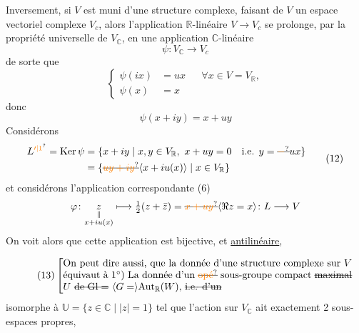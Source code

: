 Inversement, si $V$ est muni d'une structure complexe,  faisant de $V$ un espace vectoriel complexe $V_c$, alors l'application  $\mathbb R$-linéaire $V\longrightarrow V_c$ se prolonge, par la propriété universelle de $V_{\mathbb C}$, en une application $\mathbb C$-linéaire
\[
 \psi\colon V_{\mathbb C}\longrightarrow V_c \tag*{(9)}
\]
de sorte que
\[
 \left\{\begin{aligned}\psi(ix)&=ux&&\forall x\in V=V_{\mathbb R},\\ \psi(x)&=x\end{aligned}\right. \tag*{(10)}
\]
donc
\[
 \psi(x+iy)=x+uy \tag*{(11)}
\]
  Considérons
\[
 \begin{aligned}
 L^{\unsure{\prime|1}}=\mathrm{Ker}\,\psi
 &=\{x+iy\mid x,y\in V_{\mathbb R},\ x+uy=0\quad\text{i.e. }y=\deleted{\unsure{-}}ux\}\\
 &=\{\deleted{\unsure{uy+iy}}\inserted{x+iu(x)}\mid x\in V_{\mathbb R}\}
 \end{aligned}\tag*{(12)}
\]
et considérons l'application correspondante (6)
\[
 \varphi\colon\underset{\substack{\Vert\\x+iu(x)}}{z}\longmapsto\tfrac12(z+\bar z)=\deleted{\unsure{x+uy}}\inserted{\Re z=x}\colon L\longrightarrow V
\]
On voit alors que cette application est bijective, et \uline{antilinéaire},  

\[
 \tag*{(13)}
 \left[\begin{minipage}{0.84\linewidth}
 On peut dire aussi, que la donnée d'une structure complexe sur $V$ équivaut à

 $1^\circ$) La donnée d'un \deleted{\unsure{opé}} sous-groupe compact \deleted{maximal} $U$ \deleted{de $\mathrm{Gl}=$} $\inserted{G=}\mathrm{Aut}_{\mathbb R}(W)$, \deleted{i.e. d'un}
 \end{minipage}\right.
\]
 isomorphe à $\mathbb U=\{z\in\mathbb C\mid |z|=1\}$ tel que l'action sur $V_{\mathbb C}$ ait exactement 2 sous-espaces propres,

